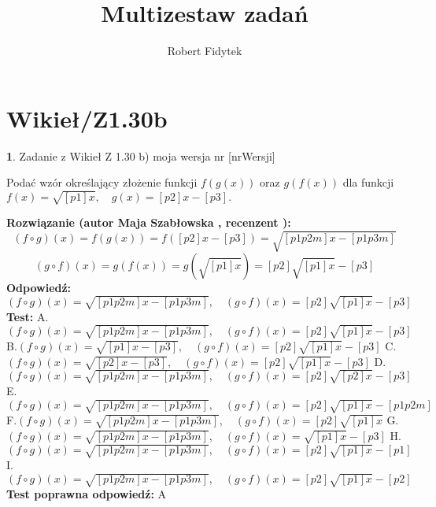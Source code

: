 \documentclass[12pt, a4paper]{article}
\title{Multizestaw zadań}
\author{Robert Fidytek}
\date{}
\theoremstyle{definition} %
\newtheorem{zad}{}
\newcommand{\kategoria}[1]{\section{#1}} %
\newcommand{\zadStart}[1]{\begin{zad}#1\newline} %
\newcommand{\zadStop}{\end{zad}}   %
\newcommand{\rozwStart}[2]{\noindent \textbf{Rozwiązanie (autor #1 , recenzent #2): }\newline} %
\newcommand{\rozwStop}{\newline}                                            %
\newcommand{\odpStart}{\noindent \textbf{Odpowiedź:}\newline}    %
\newcommand{\odpStop}{\newline}                                             %
\newcommand{\testStart}{\noindent \textbf{Test:}\newline} %
\newcommand{\testStop}{\newline} %
\newcommand{\kluczStart}{\noindent \textbf{Test poprawna odpowiedź:}\newline} %
\newcommand{\kluczStop}{\newline} %
\begin{document}
\maketitle


\kategoria{Wikieł/Z1.30b}
\zadStart{Zadanie z Wikieł Z 1.30 b)  moja wersja nr [nrWersji]}

Podać wzór określający złożenie funkcji $f(g(x))$ oraz $g(f(x))$ dla funkcji $f(x)=\sqrt{[p1]x},\quad g(x)=[p2]x-[p3].$
\zadStop
\rozwStart{Maja Szabłowska}{}
$$(f\circ g)(x)=f(g(x))=f([p2]x-[p3])=\sqrt{[p1p2m]x-[p1p3m]}$$
$$(g\circ f)(x)=g(f(x))=g(\sqrt{[p1]x})=[p2]\sqrt{[p1]x}-[p3]$$
\rozwStop
\odpStart
$(f\circ g)(x)=\sqrt{[p1p2m]x-[p1p3m]}, \quad (g\circ f)(x)=[p2]\sqrt{[p1]x}-[p3]$
\odpStop
\testStart
A.$(f\circ g)(x)=\sqrt{[p1p2m]x-[p1p3m]}, \quad (g\circ f)(x)=[p2]\sqrt{[p1]x}-[p3]$
B.$(f\circ g)(x)=\sqrt{[p1]x-[p3]}, \quad (g\circ f)(x)=[p2]\sqrt{[p1]x}-[p3]$
C.$(f\circ g)(x)=\sqrt{[p2]x-[p3]}, \quad (g\circ f)(x)=[p2]\sqrt{[p1]x}-[p3]$
D.$(f\circ g)(x)=\sqrt{[p1p2m]x-[p1p3m]}, \quad (g\circ f)(x)=[p2]\sqrt{[p2]x}-[p3]$
E.$(f\circ g)(x)=\sqrt{[p1p2m]x-[p1p3m]}, \quad (g\circ f)(x)=[p2]\sqrt{[p1]x}-[p1p2m]$
F.$(f\circ g)(x)=\sqrt{[p1p2m]x-[p1p3m]}, \quad (g\circ f)(x)=[p2]\sqrt{[p1]x}$
G.$(f\circ g)(x)=\sqrt{[p1p2m]x-[p1p3m]}, \quad (g\circ f)(x)=\sqrt{[p1]x}-[p3]$
H.$(f\circ g)(x)=\sqrt{[p1p2m]x-[p1p3m]}, \quad (g\circ f)(x)=[p2]\sqrt{[p1]x}-[p1]$
I.$(f\circ g)(x)=\sqrt{[p1p2m]x-[p1p3m]}, \quad (g\circ f)(x)=[p2]\sqrt{[p1]x}-[p2]$
\testStop
\kluczStart
A
\kluczStop
\end{document}
